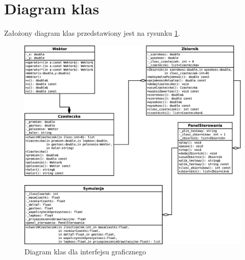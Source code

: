 \section{Diagram klas}
Założony diagram klas przedstawiony jest na rysunku \ref{fig:diagram_klas_gui}.

\begin{figure}[H]
 \begin{center}
  \includegraphics[width=\textwidth] {rysunki/diagram_klas3}
 \end{center}
 \caption{Diagram klas dla interfejsu graficznego}
 \label{fig:diagram_klas_gui}
\end{figure}
